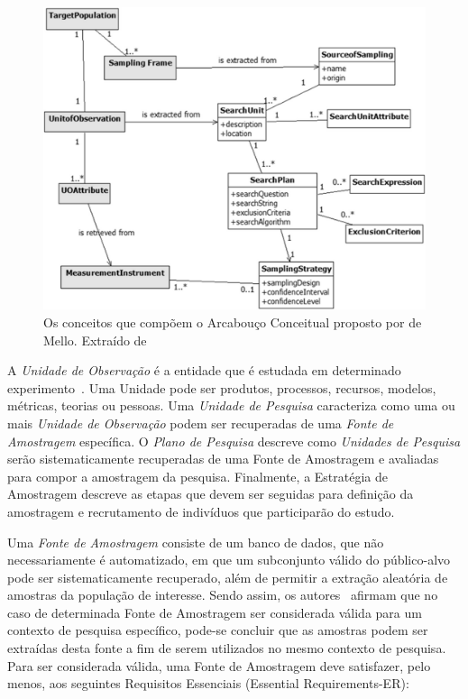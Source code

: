 \begin{figure}[htpb]
	\centering
	\includegraphics[width=0.6\linewidth]{./chapter-pesquisa-com-profissionais/img/framework-amostragem.png}
	\caption{Os conceitos que compõem o Arcabouço Conceitual proposto por de
		Mello. Extraído de~\cite{de2015investigating}}
\label{fig:framework-amostragem}
\end{figure}

A \textit{Unidade de Observação} é a entidade que é estudada em determinado
experimento~\cite{wohlin2012experimentation}. Uma Unidade pode ser produtos,
processos, recursos, modelos, métricas, teorias ou pessoas. Uma \textit{Unidade
	de Pesquisa} caracteriza como uma ou mais \textit{Unidade de Observação}
podem ser recuperadas de uma \textit{Fonte de Amostragem} específica. O
\textit{Plano de Pesquisa} descreve como \textit{Unidades de Pesquisa} serão
sistematicamente recuperadas de uma Fonte de Amostragem e avaliadas para compor
a amostragem da pesquisa. Finalmente, a Estratégia de Amostragem descreve as
etapas que devem ser seguidas para definição da amostragem e recrutamento de
indivíduos que participarão do estudo.

Uma \textit{Fonte de Amostragem} consiste de um banco de dados, que não
necessariamente é automatizado, em que um subconjunto válido do público-alvo
pode ser sistematicamente recuperado, além de permitir a extração aleatória de
amostras da população de interesse. Sendo assim, os autores~\cite{de2014towards}
afirmam que no caso de determinada Fonte de Amostragem ser considerada válida
para um contexto de pesquisa específico, pode-se concluir que as amostras podem
ser extraídas desta fonte a fim de serem utilizados no mesmo contexto de
pesquisa. Para ser considerada válida, uma Fonte de Amostragem deve satisfazer,
pelo menos, aos seguintes Requisitos Essenciais (Essential Requirements\@-\@ ER):

